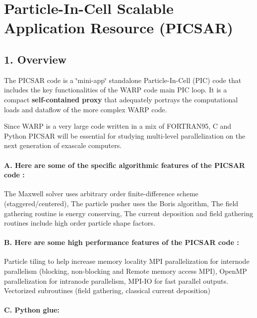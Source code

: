 \section*{Particle-\/\+In-\/\+Cell Scalable Application Resource (P\+I\+C\+S\+AR) }

\subsection*{1. Overview }

The P\+I\+C\+S\+AR code is a \char`\"{}mini-\/app\char`\"{} standalone Particle-\/\+In-\/\+Cell (P\+IC) code that includes the key functionalities of the W\+A\+RP code main P\+IC loop. It is a compact {\bfseries self-\/contained proxy} that adequately portrays the computational loads and dataflow of the more complex W\+A\+RP code.

Since W\+A\+RP is a very large code written in a mix of F\+O\+R\+T\+R\+A\+N95, C and Python P\+I\+C\+S\+AR will be essential for studying multi-\/level parallelization on the next generation of exascale computers.

\paragraph*{A. Here are some of the specific algorithmic features of the P\+I\+C\+S\+AR code \+:}

The Maxwell solver uses arbitrary order finite-\/difference scheme (staggered/centered), The particle pusher uses the Boris algorithm, The field gathering routine is energy conserving, The current deposition and field gathering routines include high order particle shape factors.

\paragraph*{B. Here are some high performance features of the P\+I\+C\+S\+AR code \+:}

Particle tiling to help increase memory locality M\+PI parallelization for internode parallelism (blocking, non-\/blocking and Remote memory access M\+PI), Open\+MP parallelization for intranode parallelism, M\+P\+I-\/\+IO for fast parallel outputs. Vectorized subroutines (field gathering, classical current deposition)

\paragraph*{C. Python glue\+:}

